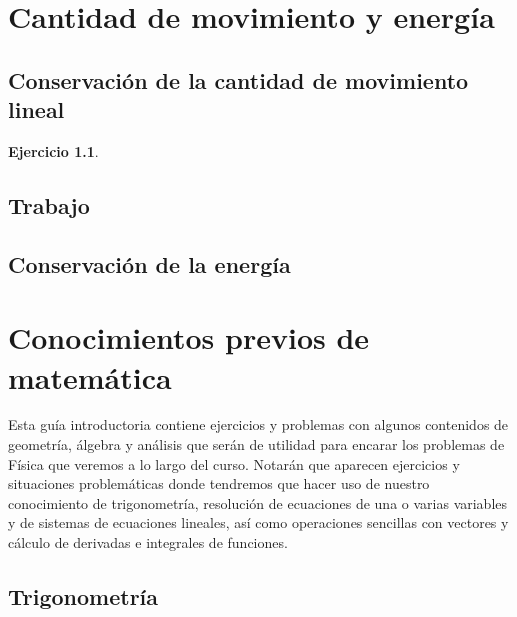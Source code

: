 \documentclass[a4paper,12pt,twoside]{book}
\newtheorem{ejercicio}{{Ejercicio}}[chapter]
\begin{document}
\chapter{Cantidad de movimiento y energía}


\section{Conservación de la cantidad de movimiento lineal}

\begin{mdframed}[style=ejercicio-intermedio]
    \begin{ejercicio}
    \end{ejercicio}
    \begin{center}
        \def\svgwidth{0.8\linewidth}
        
    \end{center}
\end{mdframed}

\section{Trabajo}


\section{Conservación de la energía}


\appendix


\chapter{Conocimientos previos de matemática}

Esta guía introductoria contiene ejercicios y problemas con algunos contenidos de geometría, álgebra y análisis que serán de utilidad para encarar los problemas de Física que veremos a lo largo del curso.
Notarán que aparecen ejercicios y situaciones problemáticas donde tendremos que hacer uso de nuestro conocimiento de trigonometría, resolución de ecuaciones de una o varias variables y de sistemas de ecuaciones lineales, así como operaciones sencillas con vectores y cálculo de derivadas e integrales de funciones.


\section{Trigonometría}
\end{document}
